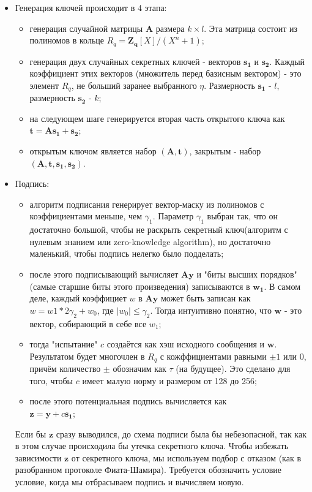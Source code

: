 \documentclass{article}
\begin{document}
	\begin{itemize}
	\item Генерация ключей происходит в 4 этапа:
		\begin{itemize}
			\item генерация случайной матрицы $\mathbf{A}$ размера $k \times l$. Эта матрица состоит из полиномов в кольце $R_{q}=\mathbf{Z_{q}}[X]/(X^n+1)$;
			\item генерация двух случайных секретных ключей - векторов $\mathbf{s_{1}}$ и $\mathbf{s_{2}}$. Каждый коэффициент этих векторов (множитель перед базисным вектором) - это элемент $R_{q}$, не больший заранее выбранного $\eta$. Размерность $\mathbf{s_{1}}$ - $l$, размерность $\mathbf{s_{2}}$ - $k$;
			\item на следующем шаге генерируется вторая часть открытого ключа как $\mathbf{t}= 	\mathbf{A}\mathbf{s_{1}} + \mathbf{s_{2}}$;
		
			\item открытым ключом является набор $(\mathbf{A}, \mathbf{t})$, закрытым - набор $(\mathbf{A}, 	\mathbf{t}, \mathbf{s_{1}}, \mathbf{s_{2}})$.
		\end{itemize}
	
	\item Подпись:
		\begin{itemize}
			\item алгоритм подписания генерирует вектор-маску из полиномов с коэффициентами меньше, чем $\gamma_{1}$. Параметр $\gamma_{1}$ выбран так, что он достаточно большой, чтобы не раскрыть секретный ключ(алгоритм с нулевым знанием или zero-knowledge algorithm), но достаточно маленький, чтобы подпись нелегко было подделать;
			\item после этого подписывающий вычисляет $\mathbf{A}\mathbf{y}$ и "биты высших порядков" (самые старшие биты этого произведения) записываются в $\mathbf{w_{1}}$. В самом деле, каждый коэффициет $w$ в $\mathbf{A}\mathbf{y}$ может быть записан как $w=w1*2\gamma_{2} + w_{0}$, где $|w_{0}| \leq \gamma_{2}$. Тогда интуитивно понятно, что $\mathbf{w}$ - это вектор, собирающий в себе все $w_{1}$;
			\item тогда "испытание" $c$ создаётся как хэш исходного сообщения и $\mathbf{w}$. Результатом будет многочлен в $R_{q}$ с кожффициентами равными $\pm1$ или $0$, причём количество $\pm$ обозначим как $\tau$ (на будущее). Это сделано для того, чтобы $c$ имеет малую норму и размером от 128 до 256;
			\item после этого потенциальная подпись вычисляется как \\
			$\mathbf{z}=\mathbf{y} +c\mathbf{s_{1}}$;
		\end{itemize}
	Если бы $\mathbf{z}$ сразу выводился, до схема подписи была бы небезопасной, так как в этом случае происходила бы утечка секретного ключа. Чтобы избежать зависимости $\mathbf{z}$ от секретного ключа, мы используем подбор с отказом (как в разобранном протоколе Фиата-Шамира). Требуется обозначить условие условие, когда мы отбрасываем подпись и вычисляем новую.
	

\end{itemize}
\end{document}
